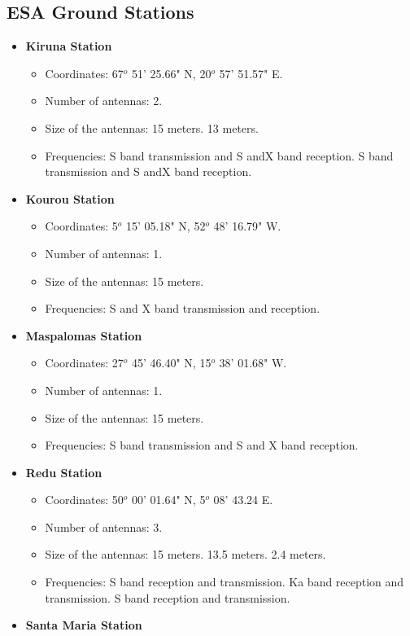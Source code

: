 \subsection{ESA Ground Stations}
\begin{itemize}
\item \textbf{Kiruna Station}
\begin{itemize}
\item Coordinates: 67$^{o}$ 51' 25.66" N, 20$^{o}$ 57' 51.57" E.
\item Number of antennas: 2.
\item Size of the antennas: 15 meters. 13 meters.
\item Frequencies: S band transmission and S andX band reception. S band transmission and S andX band reception.
\end{itemize}
\item \textbf{Kourou Station}
\begin{itemize}
\item Coordinates: 5$^{o}$ 15' 05.18" N, 52$^{o}$ 48' 16.79" W.
\item Number of antennas: 1.
\item Size of the antennas: 15 meters.
\item Frequencies: S and X band transmission and reception.
\end{itemize}
\item \textbf{Maspalomas Station}
\begin{itemize}
\item Coordinates: 27$^{o}$ 45' 46.40" N, 15$^{o}$ 38' 01.68" W.
\item Number of antennas: 1.
\item Size of the antennas: 15 meters.
\item Frequencies: S band transmission and S and X band reception.
\end{itemize}
\item \textbf{Redu Station}
\begin{itemize}
\item Coordinates: 50$^{o}$ 00' 01.64" N, 5$^{o}$ 08' 43.24 E.
\item Number of antennas: 3.
\item Size of the antennas: 15 meters. 13.5 meters. 2.4 meters.
\item Frequencies: S band reception and transmission. Ka band reception and transmission. S band reception and transmission.
\end{itemize}
\item \textbf{Santa Maria Station}

\end{itemize}

